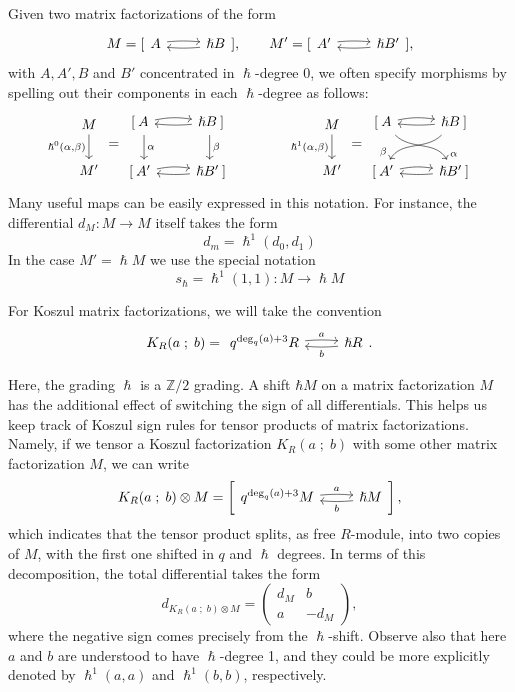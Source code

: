 \documentclass{article}
\newcommand{\Z}{\mathbb{Z}}
\renewcommand{\sc}{\; ; \;}
\newcommand{\mfshort}[4]{%
  \begin{tikzcd}[ampersand replacement=\&]
    {#1} \arrow[r, "#3", bend left=5,start anchor=east, end anchor=west, shift left=2pt]  \& 
    {#2} \arrow[l,"#4", bend left=5, start anchor=west, end anchor=east, shift left=2pt]
  \end{tikzcd}%
}
\theoremstyle{plain} %
\theoremstyle{definition} %
\theoremstyle{remark} %
\begin{document}
Given two matrix factorizations of the form
$$M=[\mfshort{  A}{\hslash B}{}{}],\qquad M'=[\mfshort{A'}{\hslash  B'}{}{}],$$
with $A,A',B$ and $B'$ concentrated in $\hslash$-degree 0, we often specify morphisms by spelling out their components in each $\hslash$-degree as follows:
\[
\begin{tikzcd}
    M \arrow[d, "{\hslash^0(\alpha,\beta)}",swap] \\ M'
\end{tikzcd}
=
\begin{tikzcd}
    {} [ \: A \arrow[d, "\alpha", shift left=3pt]\arrow[r, out=5, in=175, bend left=10]  &  \hslash B\:]\arrow[d, "\beta", shift right=1pt] \arrow[l, out=185, in=-5, swap]\\
   {}  [\:A' \arrow[r, out=5, in=175, bend left=10]& 
    \hslash B' \arrow[l, out=185, in=-5, swap]\:]
\end{tikzcd}\qquad\qquad 
\begin{tikzcd}
    M \arrow[d, "{\hslash^1(\alpha,\beta)}",swap] \\ M'
\end{tikzcd}
=
\begin{tikzcd}
    {}  [\:A \arrow[dr, "\alpha"{pos=1}, out=-45, in=120]\arrow[r, out=5, in=175, bend left=10]  &  \hslash B\:]\arrow[dl, "\beta"{pos=1}, out=-135, in=60,swap] \arrow[l, out=185, in=-5, swap]\\
     {} [\:A' \arrow[r, out=5, in=175, bend left=10]& 
     \hslash B' \arrow[l, out=185, in=-5, swap]\:]
\end{tikzcd}
\]
Many useful maps can be easily expressed in this notation. For instance, the differential $d_M:M\to M$ itself takes the form
$$d_m=\hslash^1 (d_0,d_1)$$
In the case $M'=\hslash M$ we use the special notation
$$s_\hslash =\hslash^1(1,1):M\to \hslash M$$

For Koszul matrix factorizations, we will take the convention
$$K_{R}(a\sc b)=\mfshort{q^{\deg_q(a)+3}R}{ \hslash R}{a}{b}.$$

Here, the grading $\hslash$ is a $\Z/2$ grading. A shift $\hbar M$ on a matrix factorization $M$ has the additional effect of switching the sign of all differentials. This helps us keep track of Koszul sign rules for tensor products of matrix factorizations. Namely, if we tensor a Koszul factorization $K_{R}(a\sc b)$ with some other matrix factorization $M$, we can write
$$K_{R}(a\sc b)\otimes M =\left[ \mfshort{q^{\deg_q(a)+3}M}{\hslash M}{a}{b} \right],$$
which indicates that the tensor product splits, as free $R$-module, into two copies of $M$, with the first one shifted in $q$ and $\hslash$ degrees. In terms of this decomposition, the total differential takes the form
$$d_{K_{R}(a\sc b)\otimes M} = \begin{pmatrix}
    d_M & b \\ a & -d_M
\end{pmatrix},$$
where the negative sign comes precisely from the $\hslash$-shift. Observe also that here $a$ and $b$ are understood to have $\hslash$-degree 1, and they could be more explicitly denoted by $\hslash^1(a,a)$ and $\hslash^1(b,b)$, respectively.
\end{document}

